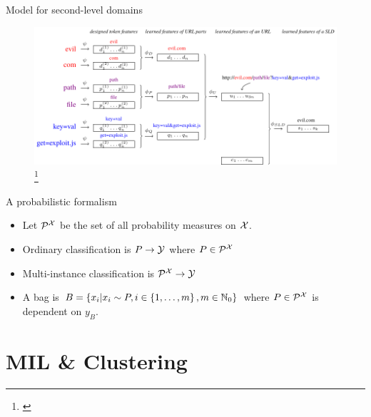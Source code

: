 \documentclass[10pt]{beamer}
\newcommand{\mathspace}{\ensuremath{\mathcal}}
\newcommand{\mathfield}{\ensuremath{\mathbb}}
\begin{document}
\begin{frame}{Model for second-level domains}
	\begin{figure}
		\centering
		\includegraphics[width=\textwidth]{images/URL-model/URL-model.pdf}\footnote{\cite{dedic_loss_2020}}
	\end{figure}
\end{frame}

\begin{frame}{A probabilistic formalism}
	\begin{itemize}
		\item Let \( \mathcal{P}^\mathspace{X} \) be the set of all probability measures on \( \mathspace{X} \).
		\item Ordinary classification is \( P \to \mathspace{Y} \) where \( P \in \mathcal{P}^\mathspace{X} \)
		\item Multi-instance classification is \( \mathcal{P}^\mathspace{X} \to \mathspace{Y} \)
		\item A bag is \( B = \left\{ x_i \middle| x_i \sim P, i \in \left\{ 1, \dots, m \right\}, m \in \mathfield{N}_0 \right\} \) where \( P \in \mathcal{P}^\mathspace{X} \) is dependent on \( y_B \).
	\end{itemize}
\end{frame}

\section{MIL \& Clustering}
\end{document}

